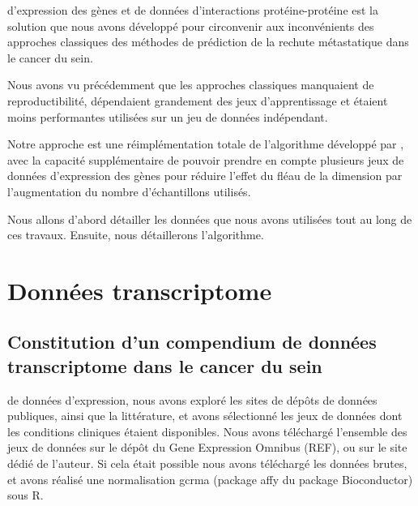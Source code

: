 			 d'expression des gènes et de données d'interactions protéine-protéine est la solution que nous avons développé pour circonvenir aux inconvénients des approches classiques des méthodes de prédiction de la rechute métastatique dans le cancer du sein.

			Nous avons vu précédemment que les approches classiques manquaient de reproductibilité, dépendaient grandement des jeux d'apprentissage et étaient moins performantes utilisées sur un jeu de données indépendant.

			Notre approche est une réimplémentation totale de l'algorithme développé par \citeauthor{Chuang2007}, avec la capacité supplémentaire de pouvoir prendre en compte plusieurs jeux de données d'expression des gènes pour réduire l'effet du fléau de la dimension par l'augmentation du nombre d'échantillons utilisés.

			Nous allons d'abord détailler les données que nous avons utilisées tout au long de ces travaux.
			Ensuite, nous détaillerons l'algorithme.

	\section{\textcolor{green!45!black}{Données transcriptome}}\label{sec:GEP}

		\subsection{\textcolor{green!45!black}{Constitution d'un compendium de données transcriptome dans le cancer du sein}}
			 de données d'expression, nous avons exploré les sites de dépôts de données publiques, ainsi que la littérature, et avons sélectionné les jeux de données dont les conditions cliniques étaient disponibles.
			Nous avons téléchargé l'ensemble des jeux de données sur le dépôt du Gene Expression Omnibus (REF), ou sur le site dédié de l'auteur. Si cela était possible nous avons téléchargé les données brutes, et avons réalisé une normalisation gcrma (package affy du package Bioconductor) sous R.

